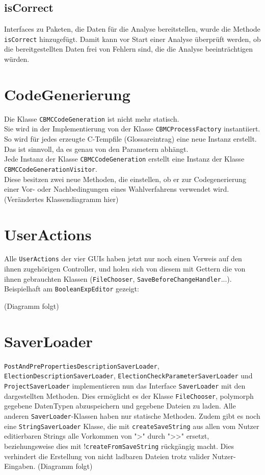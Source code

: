 \documentclass[a4paper]{scrreprt}
\begin{document}
\subsection{isCorrect}
Interfaces zu Paketen, die Daten für die Analyse bereitstellen, wurde die Methode \verb!isCorrect! hinzugefügt. Damit kann vor Start einer Analyse überprüft werden, ob die bereitgestellten Daten frei von Fehlern sind, die die Analyse beeinträchtigen würden.


\section{CodeGenerierung}

Die Klasse \verb!CBMCCodeGeneration! ist nicht mehr statisch. \\
Sie wird in der Implementierung von der Klasse \verb!CBMCProcessFactory! instantiiert. \\
So wird für jedes erzeugte C-Tempfile (Glossareintrag) eine neue Instanz erstellt. Das ist sinnvoll, da es genau von den Parametern abhängt. \\
Jede Instanz der Klasse \verb!CBMCCodeGeneration! erstellt eine Instanz der Klasse \verb!CBMCCodeGenerationVisitor!. \\
Diese besitzen zwei neue Methoden, die einstellen, ob er zur Codegenerierung einer Vor- oder Nachbedingungen eines Wahlverfahrens verwendet wird.  \\
(Verändertes Klassendiagramm hier)

\section{UserActions}
Alle \verb!UserActions! der vier GUIs haben jetzt nur noch einen Verweis auf den ihnen zugehörigen Controller, und holen sich von diesem mit Gettern die von ihnen gebrauchten Klassen (\verb!FileChooser!, \verb!SaveBeforeChangeHandler!...). Beispielhaft am \verb!BooleanExpEditor! gezeigt:
\newline

(Diagramm folgt)
\newline

\section{SaverLoader}
\verb!PostAndPrePropertiesDescriptionSaverLoader!, \verb!ElectionDescriptionSaverLoader!, \verb!ElectionCheckParameterSaverLoader! und \verb!ProjectSaverLoader! implementieren nun das Interface \verb!SaverLoader! mit den dargestellten Methoden. Dies ermöglicht es der Klasse \verb!FileChooser!, polymorph gegebene DatenTypen abzuspeichern und gegebene Dateien zu laden.
Alle anderen \verb!SaverLoader!-Klassen haben nur statische Methoden.
Zudem gibt es noch eine \verb!StringSaverLoader! Klasse, die mit \verb!createSaveString! aus allen vom Nutzer editierbaren Strings alle Vorkommen von ">" durch ">>" ersetzt, beziehungsweise dies mit !\verb!createFromSaveString! rückgängig macht. Dies verhindert die Erstellung von nicht ladbaren Dateien trotz valider Nutzer-Eingaben.
\newline
(Diagramm folgt)
\newline
\end{document}
